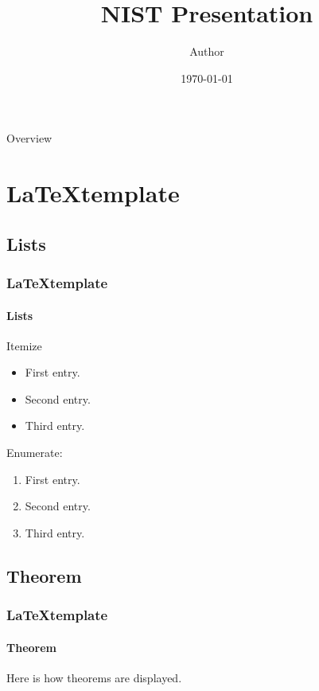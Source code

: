 \documentclass[aspectratio=169]{beamer}
\title{NIST Presentation}
\date[\today]{\today}
\author[Author]{Author}
\begin{document}
\begin{frame}[plain]
\titlepage
\end{frame}

\begin{frame}{Overview}
\tableofcontents
\end{frame}

\section{\LaTeX template}

\subsection{Lists}
\begin{frame}
  \frametitle{\LaTeX template}
  \framesubtitle{Lists}

  Itemize

  \begin{itemize}
    \item First entry.
    \item Second entry.
    \item Third entry.
  \end{itemize}

  Enumerate:

  \begin{enumerate}
    \item First entry.
    \item Second entry.
    \item Third entry.
  \end{enumerate}
\end{frame}

\subsection{Theorem}
\begin{frame}
  \frametitle{\LaTeX template}
  \framesubtitle{Theorem}

  \begin{theorem}[Example]
    Here is how theorems are displayed.
  \end{theorem}
\end{frame}
\end{document}
